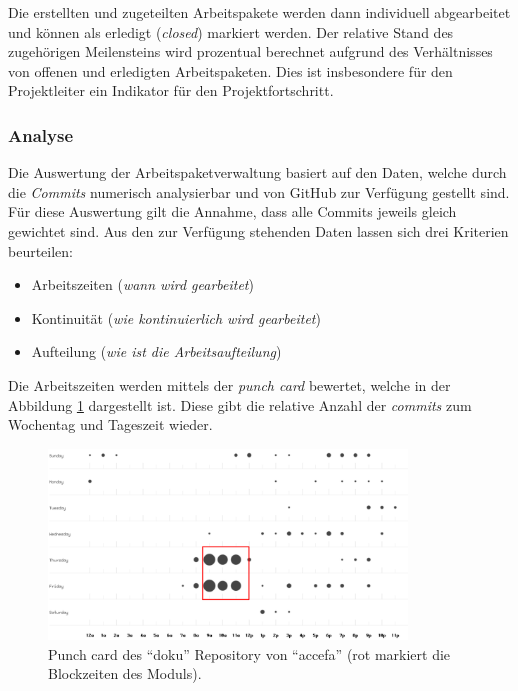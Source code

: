Die erstellten und zugeteilten Arbeitspakete werden dann individuell
abgearbeitet und können als erledigt (\emph{closed}) markiert werden.
Der relative Stand des zugehörigen Meilensteins wird prozentual
berechnet aufgrund des Verhältnisses von offenen und erledigten
Arbeitspaketen. Dies ist insbesondere für den Projektleiter ein
Indikator für den Projektfortschritt.

\subsubsection{Analyse}\label{sec:issue-analysis}
Die Auswertung der Arbeitspaketverwaltung basiert auf den Daten, welche
durch die \emph{Commits} numerisch analysierbar und von GitHub zur
Verfügung gestellt sind. Für diese Auswertung gilt die Annahme, dass
alle Commits jeweils gleich gewichtet sind. Aus den zur Verfügung
stehenden Daten lassen sich drei Kriterien beurteilen:

\begin{itemize}
	\item Arbeitszeiten \hfill{} (\textit{wann wird gearbeitet})
	\item Kontinuität \hfill{} (\textit{wie kontinuierlich wird gearbeitet})
	\item Aufteilung \hfill{} (\textit{wie ist die Arbeitsaufteilung})
\end{itemize}

Die Arbeitszeiten werden mittels der \emph{punch card} bewertet, welche
in der Abbildung \ref{fig:gh-punchcard} dargestellt ist. Diese gibt die
relative Anzahl der \emph{commits} zum Wochentag und Tageszeit wieder.

\begin{figure}[h!]
	\centering
	\includegraphics[width=0.85\textwidth]{../../fig/pm/gh-punchcard_marked.pdf}
	\caption{Punch card des ``doku'' Repository von ``accefa''
		(rot markiert die Blockzeiten des Moduls).}
	\label{fig:gh-punchcard}
\end{figure}

